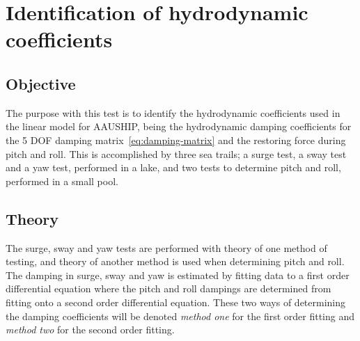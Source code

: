 \chapter{Identification of hydrodynamic coefficients}
\label{app:damping}

\section{Objective}
The purpose with this test is to
identify the hydrodynamic coefficients used in the linear model for
AAUSHIP, being the hydrodynamic damping coefficients for the 5 \ac{DOF} damping
matrix~\vref{eq:damping-matrix} and the restoring force during pitch and roll. This is accomplished by
three sea trails; a surge test, a sway test and a yaw
test, performed in a lake, and two tests to determine pitch and roll, performed in a small pool.

\section{Theory}
The surge, sway and yaw tests are performed with theory of one method of testing, and theory of another method is used when determining pitch and roll. The damping in surge, sway and yaw is estimated by fitting data to a first order differential equation where the pitch and roll dampings are determined from fitting onto a second order differential equation. These two ways of determining the damping coefficients will be denoted \textit{method one} for the first order fitting and \textit{method two} for the second order fitting.

